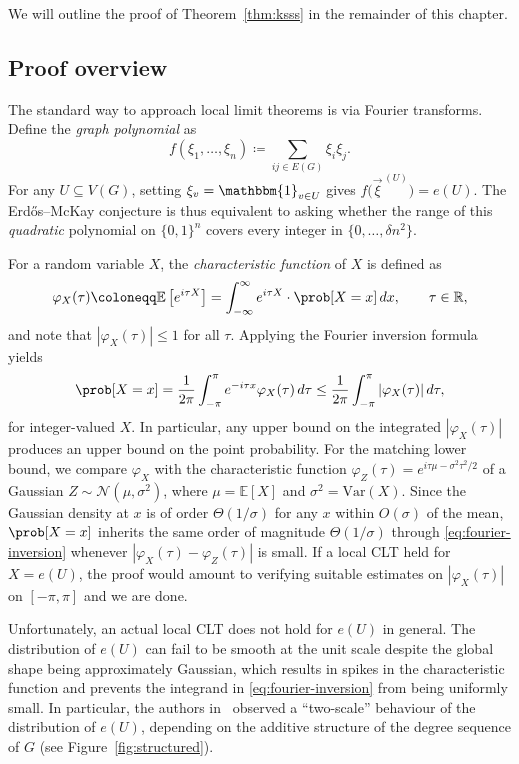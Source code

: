 We will outline the proof of Theorem~\ref{thm:ksss} in the remainder of this chapter.

\subsection{Proof overview}
\label{sec:proof-overview}

The standard way to approach local limit theorems is via Fourier transforms. Define the \emph{graph polynomial} as
\[
  f(\xi_1, \ldots, \xi_n) \coloneqq \sum_{ij \in E(G)} \xi_i \xi_j.
\]
For any $U \subseteq V(G)$, setting $\xi_v = \mathbbm{1}_{v \in U}$ gives $f\bigl(\vec{\xi}^{\,(U)}\bigr) = e(U)$. The Erd\H{o}s--McKay conjecture is thus equivalent to asking whether the range of this \textit{quadratic} polynomial on $\{0,1\}^n$ covers every integer in $\{0, \ldots, \delta n^2\}$.

For a random variable $X$, the \textit{characteristic function} of $X$ is defined as
\[
\varphi_X(\tau) \coloneqq \mathbb{E} \left[e^{i\tau X}\right] = \int_{-\infty}^{\infty} e^{i\tau X} \cdot \prob[X = x] \, dx, \qquad \tau \in \mathbb{R},
\]
and note that $|\varphi_X(\tau)| \leq 1$ for all $\tau$. Applying the Fourier inversion formula yields
\begin{equation}
\label{eq:fourier-inversion}
\prob[X = x] = \frac{1}{2\pi}\int_{-\pi}^{\pi} e^{-i\tau x}  \varphi_X(\tau) \, d\tau \leq \frac{1}{2\pi}\int_{-\pi}^{\pi} |\varphi_X(\tau)| \, d\tau,
\end{equation}
for integer-valued $X$. In particular, any upper bound on the integrated $|\varphi_X(\tau)|$ produces an upper bound on the point probability. For the matching lower bound, we compare $\varphi_X$ with the characteristic function $\varphi_Z(\tau) = e^{i\tau\mu - \sigma^2\tau^2/2}$ of a Gaussian $Z \sim \mathcal{N}(\mu, \sigma^2)$, where $\mu = \mathbb{E}[X]$ and $\sigma^2 = \mathrm{Var}(X)$. Since the Gaussian density at $x$ is of order $\Theta(1/\sigma)$ for any $x$ within $O(\sigma)$ of the mean, $\prob[X = x]$ inherits the same order of magnitude $\Theta(1/\sigma)$ through \eqref{eq:fourier-inversion} whenever $|\varphi_X(\tau) - \varphi_Z(\tau)|$ is small. If a local CLT held for $X = e(U)$, the proof would amount to verifying suitable estimates on $|\varphi_X(\tau)|$ on $[-\pi, \pi]$ and we are done.

Unfortunately, an actual local CLT does not hold for $e(U)$ in general. The distribution of $e(U)$ can fail to be smooth at the unit scale despite the global shape being approximately Gaussian, which results in spikes in the characteristic function and prevents the integrand in \eqref{eq:fourier-inversion} from being uniformly small. In particular, the authors in~\cite{Kwan_2023} observed a ``two-scale'' behaviour of the distribution of $e(U)$, depending on the additive structure of the degree sequence of $G$ (see Figure~\ref{fig:structured}).

